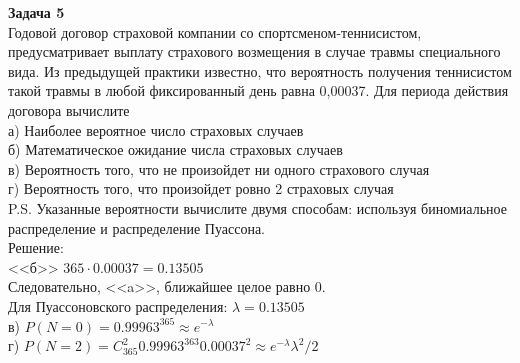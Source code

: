 \documentclass[pdftex,12pt,a4paper]{article}
\begin{document}


\textbf{Задача 5} \\ %
Годовой договор страховой компании со спортсменом-теннисистом, предусматривает выплату страхового возмещения  в случае травмы специального вида. Из предыдущей практики известно, что вероятность получения теннисистом такой травмы  в любой фиксированный день равна 0,00037. Для периода действия договора вычислите \\
а) Наиболее вероятное число страховых случаев  \\
б) Математическое ожидание числа страховых случаев \\
в) Вероятность того, что не произойдет ни одного страхового случая \\
г) Вероятность того, что произойдет ровно 2 страховых случая \\
P.S. Указанные вероятности вычислите двумя способам: используя биномиальное распределение и распределение Пуассона.\\
Решение: \\
<<б>> $365\cdot 0.00037=0.13505$ \\
Следовательно, <<a>>, ближайшее целое равно 0. \\
Для Пуассоновского распределения: $\lambda=0.13505$ \\
в) $P(N=0)=0.99963^{365}\approx e^{-\lambda}$ \\
г) $P(N=2)=C_{365}^{2}0.99963^{363}0.00037^{2}\approx e^{-\lambda}\lambda^{2}/2$ \\
\end{document}
